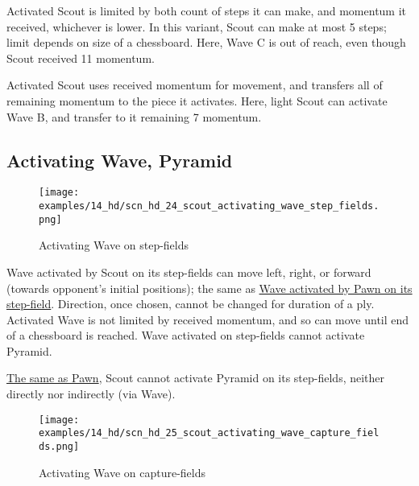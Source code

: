 \vspace*{-0.5\baselineskip}
Activated Scout is limited by both count of steps it can make, and momentum it
received, whichever is lower. In this variant, Scout can make at most 5 steps;
limit depends on size of a chessboard. Here, Wave C is out of reach, even though
Scout received 11 momentum.

Activated Scout uses received momentum for movement, and transfers all of
remaining momentum to the piece it activates. Here, light Scout can activate
Wave B, and transfer to it remaining 7 momentum.

\clearpage %

\subsection*{Activating Wave, Pyramid}
\label{sec:Hemera's Dawn/Scout/Activating Wave, Pyramid}

\vspace*{-1.3\baselineskip}
\noindent
\begin{figure}[!h]
\texttt{[image: examples/14\_hd/scn\_hd\_24\_scout\_activating\_wave\_step\_fields.png]}
\vspace*{-1.3\baselineskip}
\caption{Activating Wave on step-fields}
\label{fig:scn_hd_24_scout_activating_wave_step_fields}
\end{figure}

\vspace*{-0.5\baselineskip}
Wave activated by Scout on its step-fields can move left, right, or forward
(towards opponent's initial positions); the same as
\hyperref[fig:scn_n_16_sideways_pawn_activated_wave]{Wave activated by Pawn on its step-field}.
Direction, once chosen, cannot be changed for duration of a ply. Activated
Wave is not limited by received momentum, and so can move until end of a
chessboard is reached. Wave activated on step-fields cannot activate Pyramid.

\hyperref[fig:scn_n_17_sideways_pawn_does_not_activate_pyramid]{The same as Pawn},
Scout cannot activate Pyramid on its step-fields, neither directly nor indirectly
(via Wave).

\clearpage %

\vspace*{-2.3\baselineskip}
\noindent
\begin{figure}[!h]
\texttt{[image: examples/14\_hd/scn\_hd\_25\_scout\_activating\_wave\_capture\_fields.png]}
\vspace*{-1.3\baselineskip}
\caption{Activating Wave on capture-fields}
\label{fig:scn_hd_25_scout_activating_wave_capture_fields}
\end{figure}

